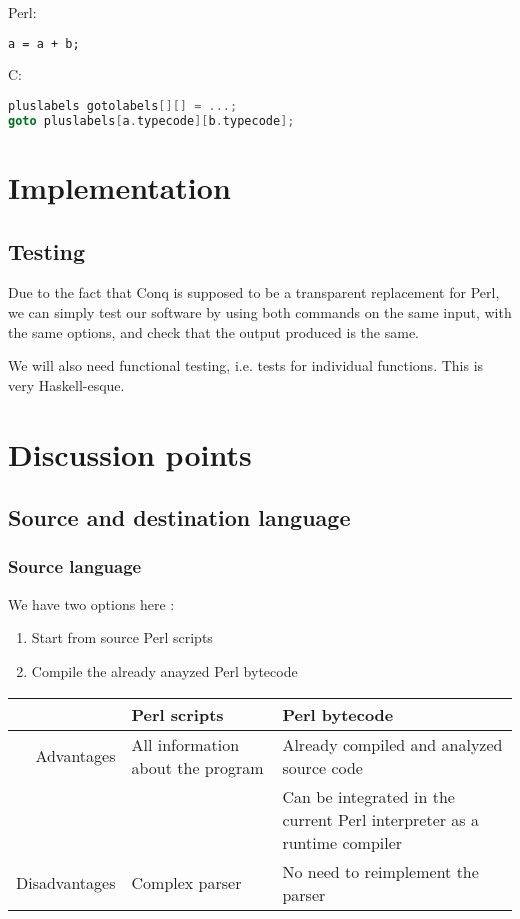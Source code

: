 \documentclass[11pt,a4paper]{report}
\newcommand{\pgl}[1]{\textsf{#1}}
\begin{document}
Perl:
\begin{lstlisting}[language=perl]
a = a + b;
\end{lstlisting}

C:
\begin{lstlisting}[language=C]
pluslabels gotolabels[][] = ...;
goto pluslabels[a.typecode][b.typecode];
\end{lstlisting}

\chapter{Implementation}

\section{Testing}

Due to the fact that Conq is supposed to be a transparent replacement for \pgl{Perl}, we can simply test our software by using both commands on the same input, with the same options, and check that the output produced is the same.

We will also need functional testing, i.e. tests for individual functions. This is very \pgl{Haskell}-esque.

\chapter{Discussion points}

\section{Source and destination language}

\subsection{Source language}

We have two options here :
\begin{enumerate}
\item Start from source Perl scripts
\item Compile the already anayzed Perl bytecode
\end{enumerate}

\begin{tabular}{|r|l|l|}
\hline
	& Perl scripts	& Perl bytecode \\
\hline
Advantages	& All information about the program	& Already compiled and analyzed source code \\
	&	& Can be integrated in the current Perl interpreter as a runtime compiler \\
\hline
Disadvantages	& Complex parser	& No need to reimplement the parser \\
\hline
\end{tabular}
\end{document}
